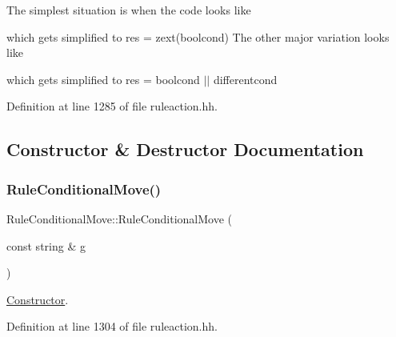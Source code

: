The simplest situation is when the code looks like 
\begin{DoxyCode}{0}
\DoxyCodeLine{\textcolor{keywordflow}{else}}
\end{DoxyCode}


which gets simplified to {\ttfamily res = zext(boolcond)} The other major variation looks like 
\begin{DoxyCode}{0}
\DoxyCodeLine{\textcolor{keywordflow}{else}}
\end{DoxyCode}


which gets simplified to {\ttfamily res = boolcond $\vert$$\vert$ differentcond} 

Definition at line 1285 of file ruleaction.\+hh.



\subsection{Constructor \& Destructor Documentation}
\mbox{\label{class_rule_conditional_move_aa2aa312620374a34b57c723c82aec169}} 
\subsubsection{\texorpdfstring{RuleConditionalMove()}{RuleConditionalMove()}}
{\footnotesize\ttfamily Rule\+Conditional\+Move\+::\+Rule\+Conditional\+Move (\begin{DoxyParamCaption}\item[{const string \&}]{g }\end{DoxyParamCaption})\hspace{0.3cm}{\ttfamily [inline]}}



\mbox{\hyperlink{class_constructor}{Constructor}}. 



Definition at line 1304 of file ruleaction.\+hh.

